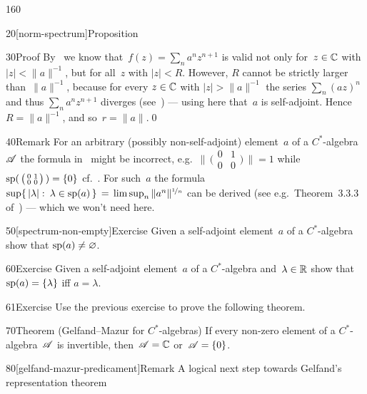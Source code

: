 \begin{parsec}{160}
\begin{point}{20}[norm-spectrum]{Proposition}
\begin{point}{30}{Proof}
By~
we know that~$f(z)=\sum_n a^nz^{n+1}$
is valid not only for~$z\in \mathbb{C}$ with $\left|z\right|< \|a\|^{-1}$,
but for all~$z$ with $\left|z\right|< R$.
However, $R$ cannot be strictly larger than~$\|a\|^{-1}$,
because for every $z\in\mathbb{C}$ with $\left|z\right|>\|a\|^{-1}$
the series $\sum_n(az)^n$ 
and thus $\sum_n a^n{z}^{n+1}$ diverges (see~)
--- using here that~$a$ is self-adjoint.
Hence~$R=\|a\|^{-1}$, and so~$r=\|a\|$.\qed
\end{point}
\end{point}
\begin{point}{40}{Remark}%
For an arbitrary (possibly non-self-adjoint)
element~$a$ of a $C^*$-algebra~$\mathscr{A}$
the formula in~
might be incorrect, e.g.~$\bigl\|\,\bigl(\begin{smallmatrix}
0& 1\\
0 & 0
\end{smallmatrix}\bigr)\,\|=1$
while 
$\mathrm{sp}(\,\bigl(\begin{smallmatrix}
0& 1\\
0 & 0
\end{smallmatrix}\bigr)\,)=\{0\}$
cf.~.
For such~$a$
the formula
$\sup\{\,\left|\lambda\right|\colon\, \lambda\in \mathrm{sp}(a)\,\}
\,=\, \limsup_n \|a^n\|^{\nicefrac{1}{n}}$
	can be derived (see e.g.~Theorem~3.3.3 of~\cite{kr}) --- 
	which we won't need here.
\end{point}
\begin{point}{50}[spectrum-non-empty]{Exercise}%
Given a self-adjoint element~$a$ of a $C^*$-algebra show that
$\mathrm{sp}(a)\neq \varnothing$.
\end{point}
\begin{point}{60}{Exercise}%
Given a self-adjoint element~$a$ of a $C^*$-algebra
and~$\lambda\in\mathbb{R}$
show that $\mathrm{sp}(a) =\{\lambda\}$ iff $a=\lambda$.
\end{point}
\begin{point}{61}{Exercise}%
Use the previous exercise to prove the following theorem.
\end{point}
\begin{point}{70}{Theorem (Gelfand--Mazur for $C^*$-algebras)}%
%
If every non-zero element of a $C^*$-algebra~$\mathscr{A}$
is invertible, then~$\mathscr{A}=\mathbb{C}$ or~$\mathscr{A}=\{0\}$.
\end{point}
\begin{point}{80}[gelfand-mazur-predicament]{Remark}%
A logical next step
towards Gelfand's representation theorem

\end{point}
\end{parsec}
